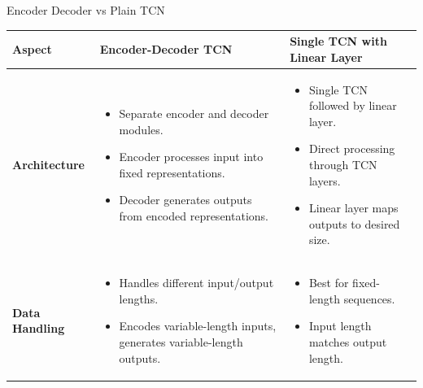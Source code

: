 \documentclass[8pt,xcolor=dvipsnames,compress]{beamer}
\begin{document}
\begin{frame}[fragile]{Encoder Decoder vs Plain TCN}
\scriptsize
\begin{table}[ht]
    \centering
    \begin{tabular}{|p{1cm}|p{4.5cm}|p{4.5cm}|}
        \hline
        \textbf{Aspect} & \textbf{Encoder-Decoder TCN} & \textbf{Single TCN with Linear Layer} \\
        \hline
        \textbf{Architecture} & 
        \begin{itemize}
            \item Separate encoder and decoder modules. 
            \item Encoder processes input into fixed representations.
            \item Decoder generates outputs from encoded representations.
        \end{itemize} & 
        \begin{itemize}
            \item Single TCN followed by linear layer.
            \item Direct processing through TCN layers.
            \item Linear layer maps outputs to desired size.
        \end{itemize} \\
        \hline
        \textbf{Data Handling} & 
        \begin{itemize}
            \item Handles different input/output lengths.
            \item Encodes variable-length inputs, generates variable-length outputs.
            
        \end{itemize} & 
        \begin{itemize}
            \item Best for fixed-length sequences.
            \item Input length matches output length.
    

\end{itemize}
\end{tabular}
\end{table}
\end{frame}
\end{document}
